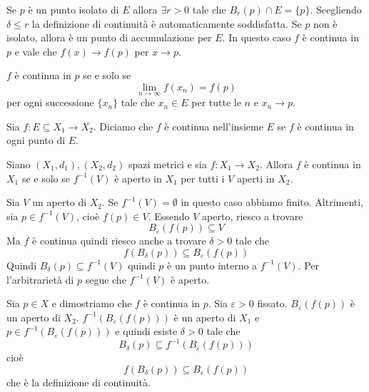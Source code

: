 \documentclass[a4paper]{article}
\begin{document}
Se \(p\) è un punto isolato di \(E\) allora \(\exists r > 0\)
tale che \(B_r(p) \cap E = \{p\}\). Scegliendo \(\delta \leq r\)
la definizione di continuità è automaticamente soddisfatta.
Se \(p\) non è isolato, allora è un punto di accumulazione per \(E\).
In questo caso \(f\) è continua in \(p\) e vale che \(f(x) \to f(p)\) per \(x\to p\).

\begin{snippetproposition}{}
    \(f\) è continua in \(p\) se e solo se
    \[
        \lim_{n\to\infty} f(x_n) = f(p)
    \]
    per ogni successione \(\{x_n\}\) tale che \(x_n \in E\)
    per tutte le \(n\) e \(x_n \to p\).
\end{snippetproposition}

\begin{snippetdefinition}{}
    Sia \(f \colon E \subseteq X_1 \to X_2\). Diciamo che \(f\) è continua nell'insieme \(E\)
    se \(f\) è continua in ogni punto di \(E\).
\end{snippetdefinition}

\begin{snippetproposition}{}
    Siano \((X_1, d_1), (X_2, d_2)\) spazi metrici e sia \(f \colon X_1 \to X_2\).
    Allora \(f\) è continua in \(X_1\) se e solo se \(f^{-1}(V)\) è aperto in \(X_1\)
    per tutti i \(V\) aperti in \(X_2\).
\end{snippetproposition}

\begin{snippetproof}{}
    \begin{iffproof}
        \item Sia \(V\) un aperto di \(X_2\). Se \(f^{-1}(V) = \emptyset\)
        in questo caso abbiamo finito. Altrimenti,
        sia \(p \in f^{-1}(V)\), cioè \(f(p) \in V\).
        Essendo \(V\) aperto, riesco a trovare \[ B_\varepsilon(f(p)) \subseteq V \]
        Ma \(f\) è continua quindi riesco anche a trovare \(\delta>0\) tale che
        \[
            f(B_\delta(p)) \subseteq B_\varepsilon(f(p))
        \]
        Quindi \(B_\delta(p) \subseteq f^{-1}(V)\) quindi \(p\) è un punto interno a
        \(f^{-1}(V)\). Per l'arbitrarietà di \(p\) segue che \(f^{-1}(V)\) è aperto.
        \item Sia \(p \in X\) e dimostriamo che \(f\) è continua in \(p\).
        Sia \(\varepsilon > 0\) fissato. \(B_\varepsilon(f(p))\)
        è un aperto di \(X_2\). \(f^{-1}(B_\varepsilon(f(p)))\) è un aperto di \(X_1\)
        e \(p \in f^{-1}(B_\varepsilon(f(p)))\) e quindi esiste \(\delta > 0\)
        tale che
        \[
            B_\delta(p) \subseteq f^{-1}(B_\varepsilon(f(p)))
        \]
        cioè
        \[
            f(B_\delta(p)) \subseteq B_\varepsilon(f(p))
        \]
        che è la definizione di continuità.
    \end{iffproof}
\end{snippetproof}
\end{document}
